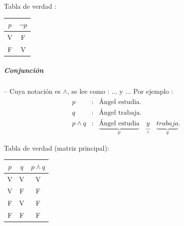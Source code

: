 \documentclass[10pt, twocolumn, landscape, a4paper]{article}
\begin{document}
Tabla de verdad : \\

\begin{center}
\begin{tabular}{|c|c|}
	\arrayrulecolor{cyan}\hline
	$p$ & $\neg p$ \\
	\hline
	V & F \\
	\hline
	F & V \\
	\hline
\end{tabular}
\end{center}

\subparagraph*{Conjunción} -- Cuya notación es $\wedge$, se lee como : ... y ... Por ejemplo :
\begin{eqnarray*}
p &:& \text{Ángel estudia}. \\
q &:& \text{Ángel trabaja}. \\
p \wedge q &:& \underbrace{\text{Ángel estudia}}_{p}\quad \underbrace{y}_{\wedge}\quad \underbrace{trabaja}_{q}.
\end{eqnarray*}

Tabla de verdad (matriz principal): \\

\begin{center}
\begin{tabular}{|c|c|c|}
	\arrayrulecolor{cyan}\hline
	$p$ & $q$ &  $p \wedge q$ \\
	\hline
	V & V & V \\
	\hline
	V & F & F \\
	\hline
	F & V & F \\
	\hline
	F & F & F \\
	\hline
\end{tabular}
\end{center}
\end{document}
